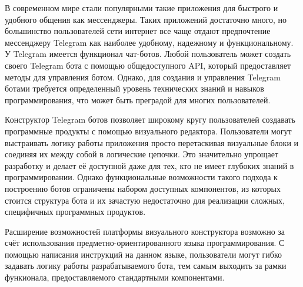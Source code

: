

В современном мире стали популярными такие приложения для быстрого и удобного общения как мессенджеры.
Таких приложений достаточно много, но большинство пользователей сети интернет все чаще отдают предпочтение мессенджеру Telegram как наиболее удобному, надежному и функциональному.
У Telegram имеется функционал чат-ботов.
Любой пользователь может создать своего Telegram бота с помощью общедоступного API, который предоставляет методы для управления ботом.
Однако, для создания и управления Telegram ботами требуется определенный уровень технических знаний и навыков программирования, что может быть преградой для многих пользователей.

Конструктор Telegram ботов позволяет широкому кругу пользователей создавать программные продукты с помощью визуального редактора.
Пользователи могут выстраивать логику работы приложения просто перетаскивая визуальные блоки и соединяя их между собой в логические цепочки.
Это значительно упрощает разработку и делает её доступной даже для тех, кто не имеет глубоких знаний в программировании.
Однако функциональные возможности такого подхода к построению ботов ограничены набором доступных компонентов,
из которых стоится структура бота и их зачастую недостаточно для реализации сложных, специфичных программных продуктов.

Расширение возможностей платформы визуального конструктора возможно
за счёт использования предметно-ориентированного языка программирования.
С помощью написания инструкций на данном языке, пользователи  могут гибко задавать логику
работы разрабатываемого бота, тем самым выходить за рамки функионала, предоставляемого стандартными компонентами.

\pagebreak

